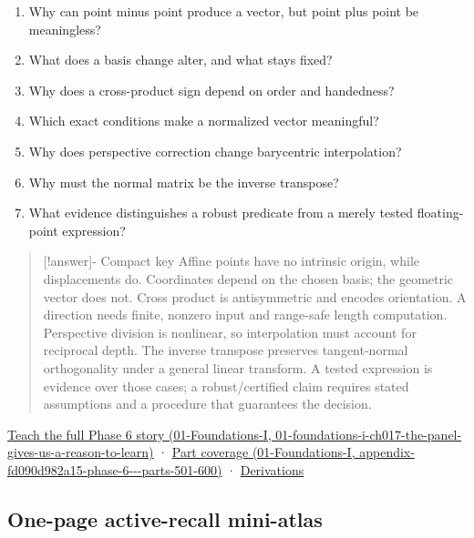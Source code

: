 \begin{enumerate}
\def\labelenumi{\arabic{enumi}.}
\tightlist
\item
  Why can point minus point produce a vector, but point plus point be meaningless?
\item
  What does a basis change alter, and what stays fixed?
\item
  Why does a cross-product sign depend on order and handedness?
\item
  Which exact conditions make a normalized vector meaningful?
\item
  Why does perspective correction change barycentric interpolation?
\item
  Why must the normal matrix be the inverse transpose?
\item
  What evidence distinguishes a robust predicate from a merely tested floating-point expression?
\end{enumerate}

\begin{quote}
{[}!answer{]}- Compact key Affine points have no intrinsic origin, while displacements do. Coordinates depend on the chosen basis; the geometric vector does not. Cross product is antisymmetric and encodes orientation. A direction needs finite, nonzero input and range-safe length computation. Perspective division is nonlinear, so interpolation must account for reciprocal depth. The inverse transpose preserves tangent-normal orthogonality under a general linear transform. A tested expression is evidence over those cases; a robust/certified claim requires stated assumptions and a procedure that guarantees the decision.
\end{quote}

\href{../01-Foundations-I/main.pdf\#nameddest=01-foundations-i-ch017-the-panel-gives-us-a-reason-to-learn}{Teach the full Phase 6 story (01-Foundations-I, 01-foundations-i-ch017-the-panel-gives-us-a-reason-to-learn)} · \href{../01-Foundations-I/main.pdf\#nameddest=appendix-fd090d982a15-phase-6---parts-501-600}{Part coverage (01-Foundations-I, appendix-fd090d982a15-phase-6-\/-\/-parts-501-600)} · \hyperref[02-foundations-ii-ch039-phase-6---geometry-reconstruction-proofs]{Derivations}

\subsection{One-page active-recall mini-atlas}\label{appendix-38d9c8aca357-one-page-active-recall-mini-atlas}


